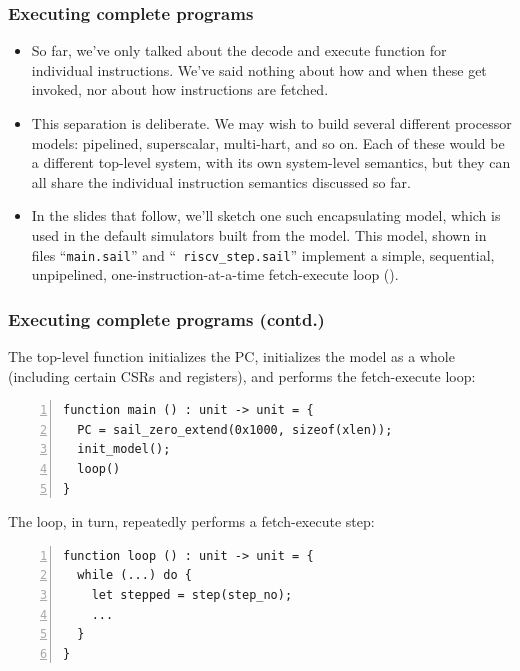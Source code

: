 \documentclass[aspectratio=169]{beamer}
\newcommand{\slidefont}{\scriptsize}
\newcommand{\cf}{\scriptsize\tt}
\begin{document}
\begin{frame}[fragile]
  \frametitle{Executing complete programs}

  \slidefont

  \begin{itemize}
  \item So far, we've only talked about the decode and execute
    function for individual instructions.  We've said nothing about
    how and when these get invoked, nor about how instructions are
    fetched.

  \item This separation is deliberate.  We may wish to build several
    different processor models: pipelined, superscalar, multi-hart,
    and so on.  Each of these would be a different top-level system,
    with its own system-level semantics, but they can all share the
    individual instruction semantics discussed so far.

  \item In the slides that follow, we'll sketch one such encapsulating
    model, which is used in the default simulators built from the
    model.  This model, shown in files ``{\cf main.sail}'' and ``{\cf
      riscv\_step.sail}'' implement a simple, sequential, unpipelined,
    one-instruction-at-a-time fetch-execute loop ().
  \end{itemize}

\end{frame}


\begin{frame}[fragile]
  \frametitle{Executing complete programs (contd.)}

  \slidefont

  The top-level function initializes the PC, initializes the model as
  a whole (including certain CSRs and registers), and performs the
  fetch-execute loop:

  \vspace{1ex}

  \begin{Verbatim}[frame=single, numbers=left, label = File main.sail]
function main () : unit -> unit = {
  PC = sail_zero_extend(0x1000, sizeof(xlen));
  init_model();
  loop()
}
  \end{Verbatim}

  The loop, in turn, repeatedly performs a fetch-execute step:

  \vspace{1ex}

  \begin{Verbatim}[frame=single, numbers=left, label = File riscv\_step.sail]
function loop () : unit -> unit = {
  while (...) do {
    let stepped = step(step_no);
    ...
  }
}
  \end{Verbatim}

\end{frame}
\end{document}
